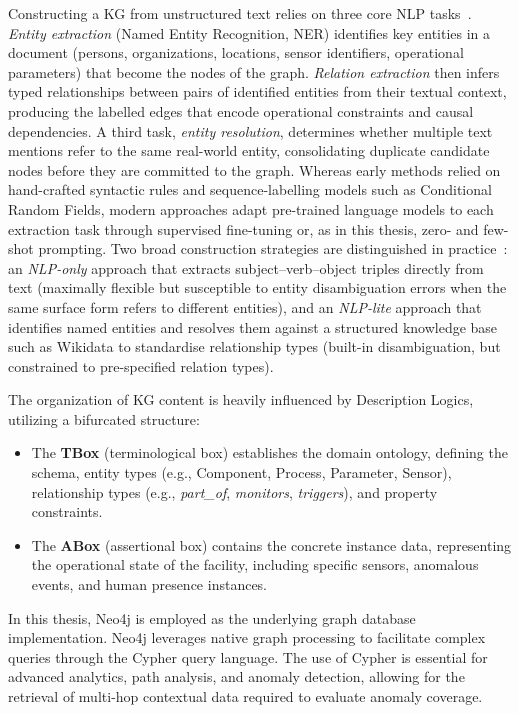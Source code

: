 ﻿\documentclass[11pt]{article}
\begin{document}
Constructing a KG from unstructured text relies on three core NLP tasks~\cite{cs520stanford}.
\emph{Entity extraction} (Named Entity Recognition, NER) identifies key entities in a document (persons, organizations, locations, sensor identifiers, operational parameters) that become the nodes of the graph.
\emph{Relation extraction} then infers typed relationships between pairs of identified entities from their textual context, producing the labelled edges that encode operational constraints and causal dependencies.
A third task, \emph{entity resolution}, determines whether multiple text mentions refer to the same real-world entity, consolidating duplicate candidate nodes before they are committed to the graph.
Whereas early methods relied on hand-crafted syntactic rules and sequence-labelling models such as Conditional Random Fields, modern approaches adapt pre-trained language models to each extraction task through supervised fine-tuning or, as in this thesis, zero- and few-shot prompting. Two broad construction strategies are distinguished in practice~\cite{sullivan2021kg}: an \emph{NLP-only} approach that extracts subject--verb--object triples directly from text (maximally flexible but susceptible to entity disambiguation errors when the same surface form refers to different entities), and an \emph{NLP-lite} approach that identifies named entities and resolves them against a structured knowledge base such as Wikidata to standardise relationship types (built-in disambiguation, but constrained to pre-specified relation types).

The organization of KG content is heavily influenced by Description Logics, utilizing a bifurcated structure:
\begin{itemize}
    \item The \textbf{TBox} (terminological box) establishes the domain ontology, defining the schema, entity types (e.g., Component, Process, Parameter, Sensor), relationship types (e.g., \textit{part\_of}, \textit{monitors}, \textit{triggers}), and property constraints.
    \item The \textbf{ABox} (assertional box) contains the concrete instance data, representing the operational state of the facility, including specific sensors, anomalous events, and human presence instances.
\end{itemize}

In this thesis, Neo4j is employed as the underlying graph database implementation. Neo4j leverages native graph processing to facilitate complex queries through the Cypher query language. The use of Cypher is essential for advanced analytics, path analysis, and anomaly detection, allowing for the retrieval of multi-hop contextual data required to evaluate anomaly coverage.
\end{document}
